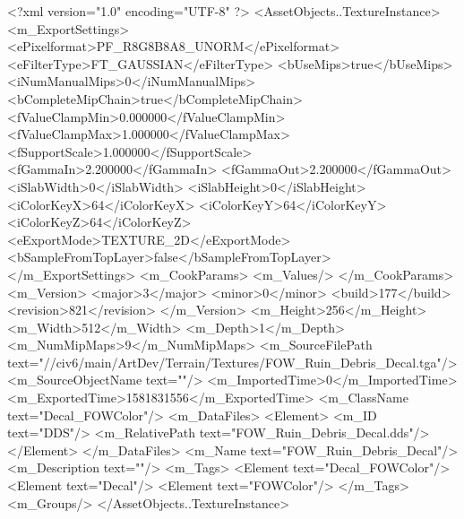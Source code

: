 <?xml version="1.0" encoding="UTF-8" ?>
<AssetObjects..TextureInstance>
	<m_ExportSettings>
		<ePixelformat>PF_R8G8B8A8_UNORM</ePixelformat>
		<eFilterType>FT_GAUSSIAN</eFilterType>
		<bUseMips>true</bUseMips>
		<iNumManualMips>0</iNumManualMips>
		<bCompleteMipChain>true</bCompleteMipChain>
		<fValueClampMin>0.000000</fValueClampMin>
		<fValueClampMax>1.000000</fValueClampMax>
		<fSupportScale>1.000000</fSupportScale>
		<fGammaIn>2.200000</fGammaIn>
		<fGammaOut>2.200000</fGammaOut>
		<iSlabWidth>0</iSlabWidth>
		<iSlabHeight>0</iSlabHeight>
		<iColorKeyX>64</iColorKeyX>
		<iColorKeyY>64</iColorKeyY>
		<iColorKeyZ>64</iColorKeyZ>
		<eExportMode>TEXTURE_2D</eExportMode>
		<bSampleFromTopLayer>false</bSampleFromTopLayer>
	</m_ExportSettings>
	<m_CookParams>
		<m_Values/>
	</m_CookParams>
	<m_Version>
		<major>3</major>
		<minor>0</minor>
		<build>177</build>
		<revision>821</revision>
	</m_Version>
	<m_Height>256</m_Height>
	<m_Width>512</m_Width>
	<m_Depth>1</m_Depth>
	<m_NumMipMaps>9</m_NumMipMaps>
	<m_SourceFilePath text="//civ6/main/ArtDev/Terrain/Textures/FOW_Ruin_Debris_Decal.tga"/>
	<m_SourceObjectName text=""/>
	<m_ImportedTime>0</m_ImportedTime>
	<m_ExportedTime>1581831556</m_ExportedTime>
	<m_ClassName text="Decal_FOWColor"/>
	<m_DataFiles>
		<Element>
			<m_ID text="DDS"/>
			<m_RelativePath text="FOW_Ruin_Debris_Decal.dds"/>
		</Element>
	</m_DataFiles>
	<m_Name text="FOW_Ruin_Debris_Decal"/>
	<m_Description text=""/>
	<m_Tags>
		<Element text="Decal_FOWColor"/>
		<Element text="Decal"/>
		<Element text="FOWColor"/>
	</m_Tags>
	<m_Groups/>
</AssetObjects..TextureInstance>

